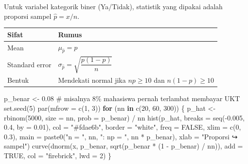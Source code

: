 \documentclass[
  indonesian,
  letterpaper,
]{book}
\newenvironment{Shaded}{\begin{snugshade}}{\end{snugshade}}
\newcommand{\AttributeTok}[1]{\textcolor[rgb]{0.40,0.45,0.13}{#1}}
\newcommand{\CommentTok}[1]{\textcolor[rgb]{0.37,0.37,0.37}{#1}}
\newcommand{\ConstantTok}[1]{\textcolor[rgb]{0.56,0.35,0.01}{#1}}
\newcommand{\ControlFlowTok}[1]{\textcolor[rgb]{0.00,0.23,0.31}{\textbf{#1}}}
\newcommand{\DecValTok}[1]{\textcolor[rgb]{0.68,0.00,0.00}{#1}}
\newcommand{\FloatTok}[1]{\textcolor[rgb]{0.68,0.00,0.00}{#1}}
\newcommand{\FunctionTok}[1]{\textcolor[rgb]{0.28,0.35,0.67}{#1}}
\newcommand{\NormalTok}[1]{\textcolor[rgb]{0.00,0.23,0.31}{#1}}
\newcommand{\OtherTok}[1]{\textcolor[rgb]{0.00,0.23,0.31}{#1}}
\newcommand{\SpecialCharTok}[1]{\textcolor[rgb]{0.37,0.37,0.37}{#1}}
\newcommand{\StringTok}[1]{\textcolor[rgb]{0.13,0.47,0.30}{#1}}
\newcounter{none} %
\begin{document}
Untuk variabel kategorik biner (Ya/Tidak), statistik yang dipakai adalah
proporsi sampel \(\hat{p} = x/n\).

{\def\LTcaptype{none} %
\begin{longtable}[]{@{}ll@{}}
\toprule\noalign{}
Sifat & Rumus \\
\midrule\noalign{}
\endhead
\bottomrule\noalign{}
\endlastfoot
Mean & \(\mu_{\hat{p}} = p\) \\
Standard error & \(\sigma_{\hat{p}} = \sqrt{\dfrac{p(1-p)}{n}}\) \\
Bentuk & Mendekati normal jika \(np \geq 10\) dan \(n(1-p) \geq 10\) \\
\end{longtable}
}

\begin{Shaded}
\begin{Highlighting}[]
\NormalTok{p\_benar }\OtherTok{\textless{}{-}} \FloatTok{0.08} \CommentTok{\# misalnya 8\% mahasiswa pernah terlambat membayar UKT}
\FunctionTok{set.seed}\NormalTok{(}\DecValTok{5}\NormalTok{)}
\FunctionTok{par}\NormalTok{(}\AttributeTok{mfrow =} \FunctionTok{c}\NormalTok{(}\DecValTok{1}\NormalTok{, }\DecValTok{3}\NormalTok{))}
\ControlFlowTok{for}\NormalTok{ (nn }\ControlFlowTok{in} \FunctionTok{c}\NormalTok{(}\DecValTok{20}\NormalTok{, }\DecValTok{60}\NormalTok{, }\DecValTok{300}\NormalTok{)) \{}
\NormalTok{p\_hat }\OtherTok{\textless{}{-}} \FunctionTok{rbinom}\NormalTok{(}\DecValTok{5000}\NormalTok{, }\AttributeTok{size =}\NormalTok{ nn, }\AttributeTok{prob =}\NormalTok{ p\_benar) }\SpecialCharTok{/}\NormalTok{ nn}
\FunctionTok{hist}\NormalTok{(p\_hat, }\AttributeTok{breaks =} \FunctionTok{seq}\NormalTok{(}\SpecialCharTok{{-}}\FloatTok{0.005}\NormalTok{, }\FloatTok{0.4}\NormalTok{, }\AttributeTok{by =} \FloatTok{0.01}\NormalTok{), }\AttributeTok{col =} \StringTok{"\#fdae6b"}\NormalTok{, }\AttributeTok{border =}
\StringTok{"white"}\NormalTok{,}
\AttributeTok{freq =} \ConstantTok{FALSE}\NormalTok{, }\AttributeTok{xlim =} \FunctionTok{c}\NormalTok{(}\DecValTok{0}\NormalTok{, }\FloatTok{0.3}\NormalTok{),}
\AttributeTok{main =} \FunctionTok{paste0}\NormalTok{(}\StringTok{"n = "}\NormalTok{, nn, }\StringTok{": np = "}\NormalTok{, nn }\SpecialCharTok{*}\NormalTok{ p\_benar), }\AttributeTok{xlab =} \StringTok{"Proporsi}
\StringTok{↪ sampel"}\NormalTok{)}
\FunctionTok{curve}\NormalTok{(}\FunctionTok{dnorm}\NormalTok{(x, p\_benar, }\FunctionTok{sqrt}\NormalTok{(p\_benar }\SpecialCharTok{*}\NormalTok{ (}\DecValTok{1} \SpecialCharTok{{-}}\NormalTok{ p\_benar) }\SpecialCharTok{/}\NormalTok{ nn)), }\AttributeTok{add =} \ConstantTok{TRUE}\NormalTok{,}
\AttributeTok{col =} \StringTok{"firebrick"}\NormalTok{, }\AttributeTok{lwd =} \DecValTok{2}\NormalTok{)}
\NormalTok{\}}
\end{Highlighting}
\end{Shaded}
\end{document}
